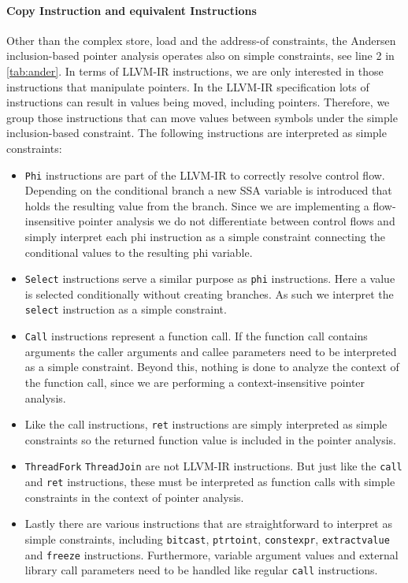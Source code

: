 \paragraph{Copy Instruction and equivalent Instructions}
Other than the complex store, load and the address-of constraints, the Andersen inclusion-based pointer analysis operates also on simple constraints, see line 2 in \autoref{tab:ander}. In terms of LLVM-IR instructions, we are only interested in those instructions that manipulate pointers. In the LLVM-IR specification lots of instructions can result in values being moved, including pointers. Therefore, we group those instructions that can move values between symbols under the simple inclusion-based constraint.
The following instructions are interpreted as simple constraints:
\begin{itemize}
    \item \verb|Phi| instructions are part of the LLVM-IR to correctly resolve control flow. Depending on the conditional branch a new SSA variable is introduced that holds the resulting value from the branch.
          Since we are implementing a flow-insensitive pointer analysis we do not differentiate between control flows and simply interpret each phi instruction as a simple constraint connecting the conditional values to the resulting phi variable.
    \item \verb|Select| instructions serve a similar purpose as \verb|phi| instructions. Here a value is selected conditionally without creating branches. As such we interpret the \verb|select| instruction as a simple constraint.
    \item \verb|Call| instructions represent a function call. If the function call contains arguments the caller arguments and callee parameters need to be interpreted as a simple constraint. Beyond this, nothing is done to analyze the context of the function call, since we are performing a context-insensitive pointer analysis.
    \item Like the call instructions, \verb|ret| instructions are simply interpreted as simple constraints so the returned function value is included in the pointer analysis.
    \item \verb|ThreadFork| \verb|ThreadJoin| are not LLVM-IR instructions. But just like the \verb|call| and \verb|ret| instructions, these must be interpreted as function calls with simple constraints in the context of pointer analysis.
    \item Lastly there are various instructions that are straightforward to interpret as simple constraints, including \verb|bitcast|, \verb|ptrtoint|, \verb|constexpr|, \verb|extractvalue| and \verb|freeze| instructions. Furthermore, variable argument values and external library call parameters need to be handled like regular \verb|call| instructions.
\end{itemize}

